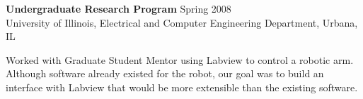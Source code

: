 \textbf{Undergraduate Research Program} \hfill Spring 2008 \\
University of Illinois, Electrical and Computer Engineering 
Department, Urbana, IL\\

\begin{description}  \itemsep -2pt %
\item Worked with Graduate Student Mentor using Labview
to control a robotic arm. Although software already existed
for the robot, our goal was to build an interface with
Labview that would be more extensible than the existing software.
\end{description}
